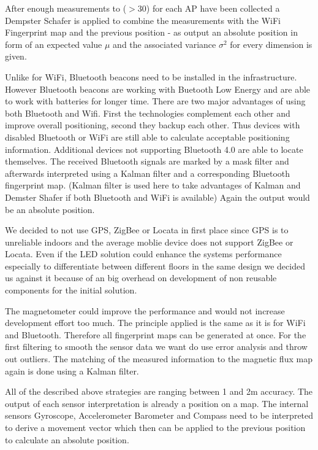 After enough measurements to ($>30$) for each AP have been collected a Dempster Schafer is applied to combine the measurements with the WiFi Fingerprint map and the previous position - as output an absolute position in form of an expected value $\mu$ and the associated variance $\sigma^2$ for every dimension is given.

Unlike for WiFi, Bluetooth beacons need to be installed in the infrastructure. However Bluetooth beacons are working with Buetooth Low Energy and are able to work with batteries for longer time. There are two major advantages of using both Bluetooth and Wifi. First the technologies complement each other and improve overall positioning, second they backup each other. Thus devices with disabled Bluetooth or WiFi are still able to calculate acceptable positioning information. Additional devices not supporting Bluetooth 4.0 are able to locate themselves.
The received Bluetooth signals are marked by a mask filter and afterwards interpreted using a Kalman filter and a corresponding Bluetooth fingerprint map. (Kalman filter is used here to take advantages of Kalman and Demster Shafer if both Bluetooth and WiFi is available) Again the output would be an absolute position. 

We decided to not use GPS, ZigBee or Locata in first place since GPS is to unreliable indoors and the average moblie device does not support ZigBee or Locata. 
Even if the LED solution could enhance the systems performance especially to differentiate between different floors in the same design we decided us against it because of an big overhead on development of non reusable components for the initial solution.

The magnetometer could improve the performance and would not increase development effort too much. The principle applied is the same as it is for WiFi and Bluetooth. Therefore all fingerprint maps can be generated at once. For the first filtering to smooth the sensor data we want do use error analysis and throw out outliers. The matching of the measured information to the magnetic flux map again is done using a Kalman filter.

All of the described above strategies are ranging between 1 and 2m accuracy. The output of each sensor interpretation is already a position on a map. The internal sensors Gyroscope, Accelerometer Barometer and Compass need to be interpreted to derive a movement vector which then can be applied to the previous position to calculate an absolute position.

